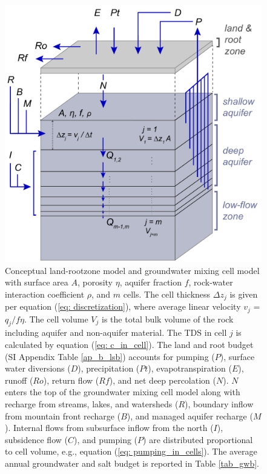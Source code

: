 \begin{figure}[H]
	\includegraphics[width=\textwidth]{ch3_figs/mm_conceptual_model.pdf}
	\caption{Conceptual land-rootzone model and groundwater mixing cell model with surface area $A$, porosity $\eta$, aquifer fraction $f$, rock-water interaction coefficient $\rho$, and $m$ cells. The cell thickness $\Delta z_j$ is given per equation (\ref{eq: discretization}), where average linear velocity $v_j$ = $q_j / f \eta$. The cell volume $V_j$ is the total bulk volume of the rock including aquifer and non-aquifer material. The TDS in cell $j$ is calculated by equation (\ref{eq: c_in_cell}). The land and root budget (SI Appendix Table \ref{ap_b_lsb}) accounts for pumping ($P$), surface water diversions ($D$), precipitation ($Pt$), evapotranspiration ($E$), runoff ($Ro$), return flow ($Rf$), and net deep percolation ($N$). $N$ enters the top of the groundwater mixing cell model along with recharge from streams, lakes, and watersheds ($R$), boundary inflow from mountain front recharge ($B$), and managed aquifer recharge ($M$). Internal flows from subsurface inflow from the north ($I$), subsidence flow ($C$), and pumping ($P$) are distributed proportional to cell volume, e.g., equation (\ref{eq: pumping_in_cells}). The average annual groundwater and salt budget is reported in Table \ref{tab_gwb}.}
	\label{fig:conceptual_model_mm}
\end{figure}



